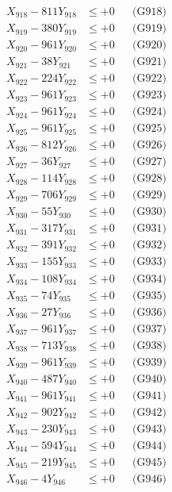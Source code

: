 \documentclass[a4paper,10pt]{article}
\begin{document}
{\begin{align}
X_{918} - 811Y_{918} &\leq +0 && \text{(G918)} \\
X_{919} - 380Y_{919} &\leq +0 && \text{(G919)} \\
X_{920} - 961Y_{920} &\leq +0 && \text{(G920)} \\
\allowbreak
X_{921} - 38Y_{921} &\leq +0 && \text{(G921)} \\
X_{922} - 224Y_{922} &\leq +0 && \text{(G922)} \\
X_{923} - 961Y_{923} &\leq +0 && \text{(G923)} \\
X_{924} - 961Y_{924} &\leq +0 && \text{(G924)} \\
X_{925} - 961Y_{925} &\leq +0 && \text{(G925)} \\
X_{926} - 812Y_{926} &\leq +0 && \text{(G926)} \\
X_{927} - 36Y_{927} &\leq +0 && \text{(G927)} \\
X_{928} - 114Y_{928} &\leq +0 && \text{(G928)} \\
X_{929} - 706Y_{929} &\leq +0 && \text{(G929)} \\
X_{930} - 55Y_{930} &\leq +0 && \text{(G930)} \\
\allowbreak
X_{931} - 317Y_{931} &\leq +0 && \text{(G931)} \\
X_{932} - 391Y_{932} &\leq +0 && \text{(G932)} \\
X_{933} - 155Y_{933} &\leq +0 && \text{(G933)} \\
X_{934} - 108Y_{934} &\leq +0 && \text{(G934)} \\
X_{935} - 74Y_{935} &\leq +0 && \text{(G935)} \\
X_{936} - 27Y_{936} &\leq +0 && \text{(G936)} \\
X_{937} - 961Y_{937} &\leq +0 && \text{(G937)} \\
X_{938} - 713Y_{938} &\leq +0 && \text{(G938)} \\
X_{939} - 961Y_{939} &\leq +0 && \text{(G939)} \\
X_{940} - 487Y_{940} &\leq +0 && \text{(G940)} \\
\allowbreak
X_{941} - 961Y_{941} &\leq +0 && \text{(G941)} \\
X_{942} - 902Y_{942} &\leq +0 && \text{(G942)} \\
X_{943} - 230Y_{943} &\leq +0 && \text{(G943)} \\
X_{944} - 594Y_{944} &\leq +0 && \text{(G944)} \\
X_{945} - 219Y_{945} &\leq +0 && \text{(G945)} \\
X_{946} - 4Y_{946} &\leq +0 && \text{(G946)} \\

\end{align}}
\end{document}
